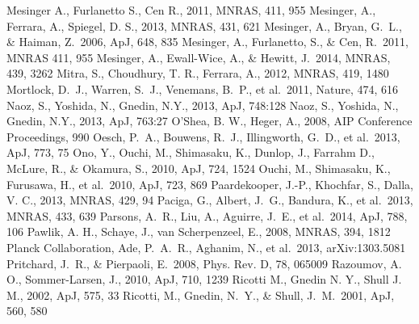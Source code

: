 \begin{thebibliography}{99}
\begin{multicols}{2}
{ Mesinger A., Furlanetto S., Cen R., 2011, MNRAS, 411, 955
 Mesinger, A., Ferrara, A., Spiegel, D. S., 2013, MNRAS, 431, 621
 Mesinger, A., Bryan, G.~L., \& Haiman, Z.\ 2006, ApJ, 648, 835 
 Mesinger, A., Furlanetto, S., \& Cen, R.\ 2011, MNRAS 411, 955 
 Mesinger, A., Ewall-Wice, A., \& Hewitt, J.\ 2014, MNRAS, 439, 3262 
 Mitra, S., Choudhury, T. R., Ferrara, A., 2012, MNRAS, 419, 1480
 Mortlock, D.~J., Warren, S.~J., Venemans, B.~P., et al.\ 2011, Nature, 474, 616 
 Naoz, S., Yoshida, N., Gnedin, N.Y., 2013, ApJ, 748:128
 Naoz, S., Yoshida, N., Gnedin, N.Y., 2013, ApJ, 763:27
 O'Shea, B. W., Heger, A., 2008, AIP Conference Proceedings, 990
 Oesch, P.~A., Bouwens, R.~J., Illingworth, G.~D., et al.\ 2013, ApJ, 773, 75 
 Ono, Y., Ouchi, M., Shimasaku, K., Dunlop, J., Farrahm D., McLure, R., \& Okamura, S., 2010, ApJ, 724, 1524
 Ouchi, M., Shimasaku, K., Furusawa, H., et al.\ 2010, ApJ, 723, 869 
 Paardekooper, J.-P., Khochfar, S., Dalla, V. C., 2013, MNRAS, 429, 94 
 Paciga, G., Albert, J.~G., Bandura, K., et al.\ 2013, MNRAS, 433, 639 
 Parsons, A.~R., Liu, A., Aguirre, J.~E., et al.\ 2014, ApJ, 788, 106 
 Pawlik, A. H., Schaye, J., van Scherpenzeel, E., 2008, MNRAS, 394, 1812
 Planck Collaboration, Ade, P.~A.~R., Aghanim, N., et al.\ 2013, arXiv:1303.5081 
 Pritchard, J.~R., \& Pierpaoli, E.\ 2008, Phys. Rev. D, 78, 065009 
 Razoumov, A. O., Sommer-Larsen, J., 2010, ApJ, 710, 1239
 Ricotti M., Gnedin N. Y., Shull J. M., 2002, ApJ, 575, 33
 Ricotti, M., Gnedin, N.~Y., \& Shull, J.~M.\ 2001, ApJ, 560, 580 
}
\end{multicols}
\end{thebibliography}
